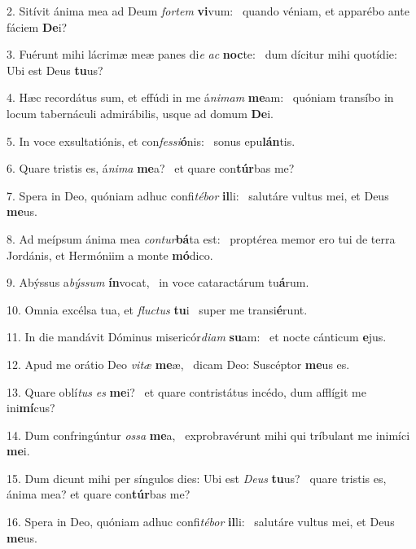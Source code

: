 2. Sitívit ánima mea ad Deum \textit{for}\textit{tem} \textbf{vi}vum: \ast\  quando véniam, et apparébo ante fáciem \textbf{De}i?\

3. Fuérunt mihi lácrimæ meæ panes di\textit{e} \textit{ac} \textbf{noc}te: \ast\  dum dícitur mihi quotídie: Ubi est Deus \textbf{tu}us?\

4. Hæc recordátus sum, et effúdi in me á\textit{ni}\textit{mam} \textbf{me}am: \ast\  quóniam transíbo in locum tabernáculi admirábilis, usque ad domum \textbf{De}i.\

5. In voce exsultatiónis, et con\textit{fes}\textit{si}\textbf{ó}nis: \ast\  sonus epu\textbf{lán}tis.\

6. Quare tristis es, á\textit{ni}\textit{ma} \textbf{me}a? \ast\  et quare con\textbf{túr}bas me?\

7. Spera in Deo, quóniam adhuc confi\textit{té}\textit{bor} \textbf{il}li: \ast\  salutáre vultus mei, et Deus \textbf{me}us.\

8. Ad meípsum ánima mea \textit{con}\textit{tur}\textbf{bá}ta est: \ast\  proptérea memor ero tui de terra Jordánis, et Hermóniim a monte \textbf{mó}dico.\

9. Abýssus a\textit{býs}\textit{sum} \textbf{ín}vocat, \ast\  in voce cataractárum tu\textbf{á}rum.\

10. Omnia excélsa tua, et \textit{fluc}\textit{tus} \textbf{tu}i \ast\  super me transi\textbf{é}runt.\

11. In die mandávit Dóminus misericór\textit{di}\textit{am} \textbf{su}am: \ast\  et nocte cánticum \textbf{e}jus.\

12. Apud me orátio Deo \textit{vi}\textit{tæ} \textbf{me}æ, \ast\  dicam Deo: Suscéptor \textbf{me}us es.\

13. Quare oblí\textit{tus} \textit{es} \textbf{me}i? \ast\  et quare contristátus incédo, dum afflígit me ini\textbf{mí}cus?\

14. Dum confringúntur \textit{os}\textit{sa} \textbf{me}a, \ast\  exprobravérunt mihi qui tríbulant me inimíci \textbf{me}i.\

15. Dum dicunt mihi per síngulos dies: Ubi est \textit{De}\textit{us} \textbf{tu}us? \ast\  quare tristis es, ánima mea? et quare con\textbf{túr}bas me?\

16. Spera in Deo, quóniam adhuc confi\textit{té}\textit{bor} \textbf{il}li: \ast\  salutáre vultus mei, et Deus \textbf{me}us.\

